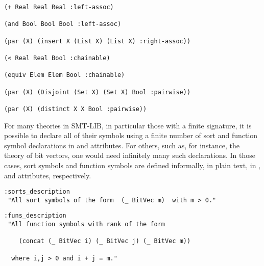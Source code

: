 \begin{lstlisting}[linewidth=35em]
(+ Real Real Real :left-assoc)

(and Bool Bool Bool :left-assoc)

(par (X) (insert X (List X) (List X) :right-assoc))

(< Real Real Bool :chainable)

(equiv Elem Elem Bool :chainable) 

(par (X) (Disjoint (Set X) (Set X) Bool :pairwise))

(par (X) (distinct X X Bool :pairwise))
\end{lstlisting}
\medskip

For many theories in SMT-LIB, in particular those with a finite signature, 
it is possible to declare all of their symbols
using a finite number of sort and function symbol declarations
in  and  attributes.
For others, such as, for instance, the theory of bit vectors,
one would need infinitely many such declarations.
In those cases, 
sort symbols and function symbols are defined informally, in plain text,
in , and  attributes,
respectively.

\begin{lstlisting}[linewidth=39em]
:sorts_description
 "All sort symbols of the form  (_ BitVec m)  with m > 0."
\end{lstlisting}

\begin{lstlisting}[linewidth=35em]
:funs_description
 "All function symbols with rank of the form

    (concat (_ BitVec i) (_ BitVec j) (_ BitVec m))

  where i,j > 0 and i + j = m."
\end{lstlisting}
\medskip


